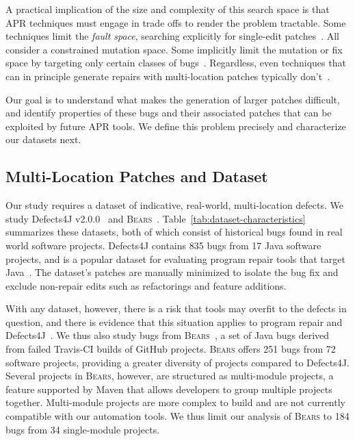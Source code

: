 \documentclass[10pt, conference]{IEEEtran}
\newcommand\bears{\textsc{Bears}\xspace}
\begin{document}
A practical implication of the size and complexity of this search space is
that APR techniques must engage in trade offs to render the problem tractable. 
Some techniques limit the \emph{fault space},
searching explicitly for single-edit patches~\cite{rsrepair,ae,hdrepair,capgen}.
All consider a constrained mutation space. 
Some implicitly limit the mutation or fix space by targeting only certain
classes of bugs~\cite{Xuan17,sapfix,DeMarco14,par}. Regardless, even techniques
that can in principle generate repairs with multi-location patches typically
don't~\cite{patch-correctness}.
%

Our goal is to understand what makes the generation of larger
patches difficult, and identify properties of these bugs and their associated
patches that can be exploited by future APR tools.  
We define this problem precisely and characterize our datasets next.

\subsection{Multi-Location Patches and Dataset}
\label{sec:bugs}

Our study requires a dataset of indicative, real-world,
multi-location defects.  We study 
Defects4J v2.0.0~\cite{defects4j} and \bears~\cite{bears}.  Table~\ref{tab:dataset-characteristics}
summarizes these datasets, both of which
consist of historical
bugs found in real world software projects. Defects4J contains 835 bugs from 
17 Java software projects, and is a popular dataset for evaluating 
program repair tools that target 
Java~\cite{durieux-repair-them-all,pearson2017evaluating,saha2017elixir,saha2019harnessing,xin2017leveraging,b2016learning}.
The dataset's patches are manually minimized to isolate the bug fix 
and exclude non-repair edits such as refactorings and feature additions.

With any dataset, however, there is a risk that tools may overfit
to the defects in question, and there is evidence that this situation applies to
program repair and Defects4J~\cite{durieux-repair-them-all}. 
We thus also study bugs from \bears~\cite{bears}, 
a set of Java bugs derived from failed Travis-CI builds of GitHub projects. 
\bears offers 251 bugs from 72 software projects, providing a greater diversity of 
projects compared to Defects4J. 
Several projects in \bears, however, are structured as multi-module projects, a feature 
supported by Maven that allows developers to group multiple projects together. Multi-module 
projects are more complex to build and are not currently compatible with our automation tools.
We thus limit our analysis of \bears to 184 bugs from 34 single-module projects.
\end{document}
